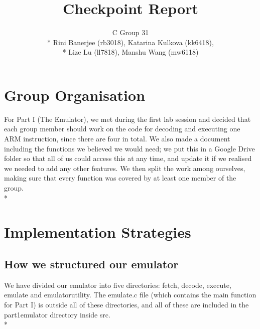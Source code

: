 \documentclass[letterpaper,11pt]{article}
\begin{document}
\title{Checkpoint Report}
\author{C Group 31\\* Rini Banerjee (rb3018), Katarina Kulkova (kk6418),\\* Lize Lu (ll7818), Manshu Wang (mw6118)}
\date{}
\maketitle

\section{Group Organisation}
For Part I (The Emulator), we met during the first lab session and decided that each group member should work on the code for decoding and executing one ARM instruction, since there are four in total. We also made a document including the functions we believed we would need; we put this in a Google Drive folder so that all of us could access this at any time, and update it if we realised we needed to add any other features. We then split the work among ourselves, making sure that every function was \textquotesingle covered\textquotesingle \-  by at least one member of the group. \\*




\section{Implementation Strategies}
\subsection{How we structured our emulator}
We have divided our emulator into five directories: fetch, decode, execute, emulate and emulatorutility. The emulate.c file (which contains the main function for Part I) is outside all of these directories, and all of these are included in the part1emulator directory inside src.\\*
\end{document}
